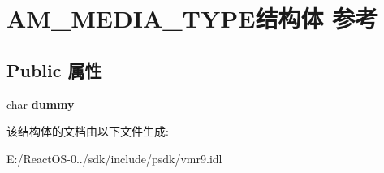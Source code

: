 \hypertarget{struct_a_m___m_e_d_i_a___t_y_p_e}{}\section{A\+M\+\_\+\+M\+E\+D\+I\+A\+\_\+\+T\+Y\+P\+E结构体 参考}
\label{struct_a_m___m_e_d_i_a___t_y_p_e}
\subsection*{Public 属性}
\begin{DoxyCompactItemize}
\item 
\mbox{\label{struct_a_m___m_e_d_i_a___t_y_p_e_a286b95bc008fcb70131fc2a9b9222759}} 
char {\bfseries dummy}
\end{DoxyCompactItemize}


该结构体的文档由以下文件生成\+:\begin{DoxyCompactItemize}
\item 
E\+:/\+React\+O\+S-\/0../sdk/include/psdk/vmr9.\+idl\end{DoxyCompactItemize}
